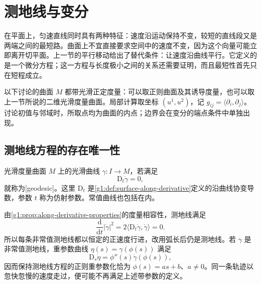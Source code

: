 
% 
% 

\section{测地线与变分}
\label{g1:sec:0902}

在平面上，匀速直线同时具有两种特征：速度沿运动保持不变，较短的直线段又是两端之间的最短路。曲面上不宜直接要求空间中的速度不变，因为这个向量可能立即离开切平面。上一节的平行移动给出了替代条件：让速度沿曲线平行。它定义的是一个微分方程；这一方程与长度极小之间的关系还需要证明，而且最短性首先只在短程成立。

\ProseParagraphBreak

以下讨论的曲面 \(M\) 都带光滑正定度量：可以取正则曲面及其诱导度量，也可以取上一节所说的二维光滑度量曲面。局部计算取坐标 \((u^1,u^2)\)，记 \(g_{ij}=\langle\partial_i,\partial_j\rangle\)。讨论初值与邻域时，所取点均为曲面的内点；边界会在变分的端点条件中单独出现。

\subsection{测地线方程的存在唯一性}
\label{g1:subsec:0902:01}

\begin{definition}
	\label{g1:def:geodesic}
	光滑度量曲面 \(M\) 上的光滑曲线 \(\gamma:I\to M\)，若满足
	\[
		\mathrm{D}_t\dot\gamma=0,
	\]
	就称为[geodesic]。这里 \(\mathrm{D}_t\) 是\cref{g1:def:surface-along-derivative}定义的沿曲线协变导数，参数 \(t\) 称为仿射参数。常值曲线也包括在内。
\end{definition}

由\cref{g1:prop:along-derivative-properties}的度量相容性，测地线满足
\[
	\frac{\mathrm{d}}{\mathrm{d}t}|\dot\gamma|^2=2\langle \mathrm{D}_t\dot\gamma,\dot\gamma\rangle=0.
\]
所以每条非常值测地线都以恒定的正速度行进，改用弧长后仍是测地线。若 \(\gamma\) 是非常值测地线，重参数曲线 \(\eta(s)=\gamma(\phi(s))\) 满足
\[
	\mathrm{D}_s\dot\eta=\phi''(s)\dot\gamma(\phi(s)),
\]
因而保持测地线方程的正则重参数化恰为 \(\phi(s)=as+b\)、\(a\ne0\)。同一条轨迹以忽快忽慢的速度走过，便可能不再满足上述带参数的定义。

\ProseParagraphBreak

